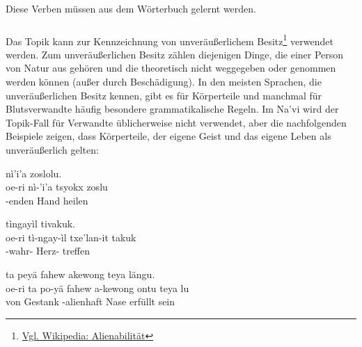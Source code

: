 \noindent Diese Verben müssen aus dem Wörterbuch gelernt werden.

\subsubsection{}
\label{syn:topical:poss}
Das Topik kann zur Kennzeichnung von unveräußerlichem Besitz\footnote{\href{https://de.wikipedia.org/wiki/Alienabilität}{Vgl. Wikipedia: Alienabilität}} verwendet werden. Zum unveräußerlichen Besitz zählen diejenigen Dinge, die einer Person von Natur aus gehören und die theoretisch nicht weggegeben oder genommen werden können (außer durch Beschädigung). In den meisten Sprachen, die unveräußerlichen Besitz kennen, gibt es für Körperteile und manchmal für Blutsverwandte häufig besondere grammatikalische Regeln. Im Na'vi wird der Topik-Fall für Verwandte üblicherweise nicht verwendet, aber die nachfolgenden Beispiele zeigen, dass Körperteile, der eigene Geist und das eigene Leben als unveräußerlich gelten:

\begin{interlin}
	\glll \Npawl{} nì'i'a  zoslolu. \\
	oe-ri nì-'i'a tsyokx zoslu \\
	 -enden Hand heilen \\
\end{interlin}

\begin{interlin}
	\glll \Npawl{} tìngayìl  tivakuk. \\
	oe-ri tì-ngay-ìl txe'lan-it takuk \\
	 -wahr- Herz- treffen \\
\end{interlin}

\begin{interlin}
	\glll \Nfilm{} ta peyä fahew akewong  teya längu. \\
	oe-ri ta po-yä fahew a-kewong ontu teya lu\\
	 von  Gestank -alienhaft Nase erfüllt sein \\
\end{interlin}

